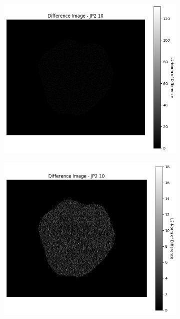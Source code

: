 \begin{figure}[htb]
\begin{subfigure}[b]{0.48\textwidth}
        \caption{}
        \label{fig:img_quality_comp_jp2_10_histo}
    \end{subfigure}
    \\
    \begin{subfigure}[b]{0.48\textwidth}
        \centering
        \includegraphics[width=\textwidth]{doc/thesis/0_figures/compare_quality/set1/jp2_10_diff_heatmap.png}
        \caption{}
        \label{fig:img_quality_comp_jp2_10_diff}
    \end{subfigure}
    \begin{subfigure}[b]{0.48\textwidth}
        \centering
        \includegraphics[width=\textwidth]{doc/thesis/0_figures/compare_quality/set1/jp2_10_diff_heatmap_rel.png}

\end{subfigure}
\end{figure}
